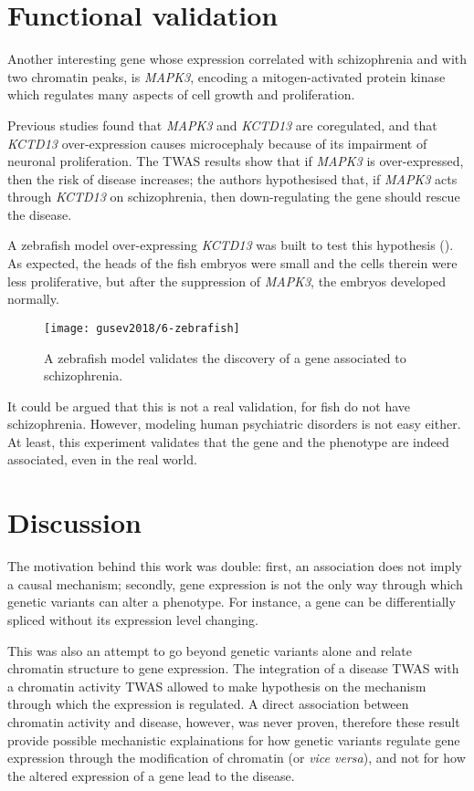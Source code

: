 \documentclass[../main.tex]{subfiles}
\begin{document}
\section{Functional validation}

Another interesting gene whose expression correlated with schizophrenia 
and with two chromatin peaks, is \textit{MAPK3}, encoding a 
mitogen-activated protein kinase which regulates many aspects of cell 
growth and proliferation. 

Previous studies found that \textit{MAPK3} and \textit{KCTD13} are 
coregulated, and that \textit{KCTD13} over-expression causes 
microcephaly because of its impairment of neuronal proliferation. The 
TWAS results show that if \textit{MAPK3} is over-expressed, then the 
risk of disease increases; the authors hypothesised that, if 
\textit{MAPK3} acts through \textit{KCTD13} on schizophrenia, then 
down-regulating the gene should rescue the disease.

A zebrafish model over-expressing \textit{KCTD13} was built to test this 
hypothesis (). As expected, the heads of the fish 
embryos were small and the cells therein were less proliferative, but 
after the suppression of \textit{MAPK3}, the embryos developed normally.

\begin{figure}
	\centering
	\texttt{[image: gusev2018/6-zebrafish]}
	\caption{A zebrafish model validates the discovery of a gene 
associated to schizophrenia.}
\end{figure}

It could be argued that this is not a real validation, for fish do not 
have schizophrenia. However, modeling human psychiatric disorders is not 
easy either. At least, this experiment validates that the gene and the 
phenotype are indeed associated, even in the real world.

\section{Discussion}

The motivation behind this work was double: first, an association does 
not imply a causal mechanism; secondly, gene expression is not the only 
way through which genetic variants can alter a phenotype. For instance, 
a gene can be differentially spliced without its expression level 
changing.

This was also an attempt to go beyond genetic variants alone and relate 
chromatin structure to gene expression. The integration of a disease 
TWAS with a chromatin activity TWAS allowed to make hypothesis on the 
mechanism through which the expression is regulated. A direct 
association between chromatin activity and disease, however, was never 
proven, therefore these result provide 
possible mechanistic explainations for how genetic variants regulate 
gene expression through the modification of chromatin (or \textit{vice 
versa}), and not for how the altered expression of a gene lead to the 
disease.
\end{document}

